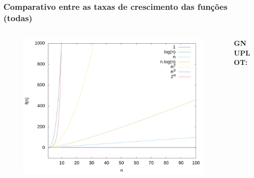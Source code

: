 \documentclass[aspectratio=169]{beamer}
\begin{document}
\begin{frame}\frametitle{Comparativo entre as taxas de crescimento das funções (todas)}
\vspace{-5mm}
\begin{columns}[T]
\begin{column}{0.5\linewidth}
\begin{figure}[h]
	\centering
	\includegraphics[height=0.65\paperheight]{graficos/todas.jpg}
\end{figure}
\end{column}
\begin{column}{0.5\linewidth}
\vspace{5mm}
{\fontsize{0}{4}\selectfont{}\textbf{GNUPLOT:}

}
\end{column}
\end{columns}
\end{frame}
\end{document}
